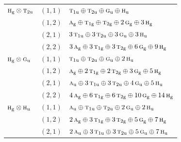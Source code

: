 \documentclass[11pt]{article}
\newcommand{\irr}[1]{\text{\normalfont\scshape #1}}
\newcommand{\ptag}[1]{\mathrm{#1}}
\begin{document}
\begin{longtable}{p{} c p{}}
\hline

$\irr{h}_{\ptag{g}}\otimes \irr{t}_{2\ptag{u}}$ & $(1,1)$ & $\irr{t}_{1\ptag{u}}\oplus \irr{t}_{2\ptag{u}}\oplus \irr{g}_{\ptag{u}}\oplus \irr{h}_{\ptag{u}}$\\

 & $(1,2)$ & $\irr{a}_{\ptag{g}}\oplus \irr{t}_{1\ptag{g}}\oplus \irr{t}_{2\ptag{g}}\oplus 2\,\irr{g}_{\ptag{g}}\oplus 3\,\irr{h}_{\ptag{g}}$\\

 & $(2,1)$ & $3\,\irr{t}_{1\ptag{u}}\oplus 3\,\irr{t}_{2\ptag{u}}\oplus 3\,\irr{g}_{\ptag{u}}\oplus 3\,\irr{h}_{\ptag{u}}$\\

 & $(2,2)$ & $3\,\irr{a}_{\ptag{g}}\oplus 3\,\irr{t}_{1\ptag{g}}\oplus 3\,\irr{t}_{2\ptag{g}}\oplus 6\,\irr{g}_{\ptag{g}}\oplus 9\,\irr{h}_{\ptag{g}}$\\

\hline

$\irr{h}_{\ptag{g}}\otimes \irr{g}_{\ptag{u}}$ & $(1,1)$ & $\irr{t}_{1\ptag{u}}\oplus \irr{t}_{2\ptag{u}}\oplus \irr{g}_{\ptag{u}}\oplus 2\,\irr{h}_{\ptag{u}}$\\

 & $(1,2)$ & $\irr{a}_{\ptag{g}}\oplus 2\,\irr{t}_{1\ptag{g}}\oplus 2\,\irr{t}_{2\ptag{g}}\oplus 3\,\irr{g}_{\ptag{g}}\oplus 5\,\irr{h}_{\ptag{g}}$\\

 & $(2,1)$ & $\irr{a}_{\ptag{u}}\oplus 3\,\irr{t}_{1\ptag{u}}\oplus 3\,\irr{t}_{2\ptag{u}}\oplus 4\,\irr{g}_{\ptag{u}}\oplus 5\,\irr{h}_{\ptag{u}}$\\

 & $(2,2)$ & $4\,\irr{a}_{\ptag{g}}\oplus 6\,\irr{t}_{1\ptag{g}}\oplus 6\,\irr{t}_{2\ptag{g}}\oplus 10\,\irr{g}_{\ptag{g}}\oplus 14\,\irr{h}_{\ptag{g}}$\\

\hline

$\irr{h}_{\ptag{g}}\otimes \irr{h}_{\ptag{u}}$ & $(1,1)$ & $\irr{a}_{\ptag{u}}\oplus \irr{t}_{1\ptag{u}}\oplus \irr{t}_{2\ptag{u}}\oplus 2\,\irr{g}_{\ptag{u}}\oplus 2\,\irr{h}_{\ptag{u}}$\\

 & $(1,2)$ & $2\,\irr{a}_{\ptag{g}}\oplus 3\,\irr{t}_{1\ptag{g}}\oplus 3\,\irr{t}_{2\ptag{g}}\oplus 5\,\irr{g}_{\ptag{g}}\oplus 7\,\irr{h}_{\ptag{g}}$\\

 & $(2,1)$ & $2\,\irr{a}_{\ptag{u}}\oplus 3\,\irr{t}_{1\ptag{u}}\oplus 3\,\irr{t}_{2\ptag{u}}\oplus 5\,\irr{g}_{\ptag{u}}\oplus 7\,\irr{h}_{\ptag{u}}$\\


\end{longtable}
\end{document}
